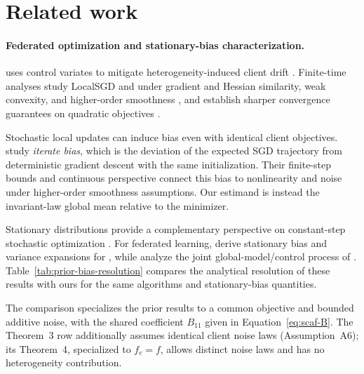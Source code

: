 \section{Related work}
\label{sec:related}

\paragraph{Federated optimization and stationary-bias characterization.}
\Scaf{} uses control variates to mitigate heterogeneity-induced client drift \citep{karimireddy2020scaffold}. Finite-time analyses study LocalSGD and \Scaf{} under gradient and Hessian similarity, weak convexity, and higher-order smoothness \citep{luo2025revisiting}, and establish sharper \Scaf{} convergence guarantees on quadratic objectives \citep{mangold2025sharper}.

Stochastic local updates can induce bias even with identical client objectives. \citet{glasgow2022sharp} study \emph{iterate bias}, which is the deviation of the expected SGD trajectory from deterministic gradient descent with the same initialization. Their finite-step bounds and continuous perspective connect this bias to nonlinearity and noise under higher-order smoothness assumptions. Our estimand is instead the invariant-law global mean relative to the minimizer.

Stationary distributions provide a complementary perspective on constant-step stochastic optimization \citep{dieuleveut2020bridging,chen2022stationary}. For federated learning, \citet{mangold2025fedavg} derive stationary bias and variance expansions for \FedAvg{}, while \citet{mangold2025scaffold} analyze the joint global-model/control process of \Scaf{}. Table~\ref{tab:prior-bias-resolution} compares the analytical resolution of these results with ours for the same algorithms and stationary-bias quantities.

The comparison specializes the prior results to a common objective and bounded additive noise, with the shared coefficient $B_{11}$ given in Equation~\eqref{eq:scaf-B}. The \FedAvg{} Theorem~3 row additionally assumes identical client noise laws (Assumption~A6); its Theorem~4, specialized to $f_c=f$, allows distinct noise laws and has no heterogeneity contribution.

